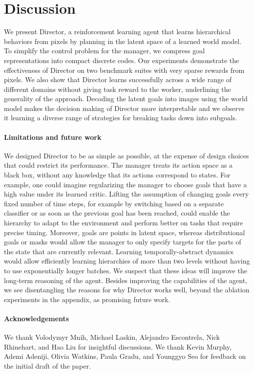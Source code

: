 \vspace*{-1ex}
\section{Discussion}
\label{sec:discussion}
\vspace*{-1.5ex}

We present Director, a reinforcement learning agent that learns hierarchical behaviors from pixels by planning in the latent space of a learned world model. 
To simplify the control problem for the manager, we compress goal representations into compact discrete codes. 
Our experiments demonstrate the effectiveness of Director on two benchmark suites with very sparse rewards from pixels. 
We also show that Director learns successfully across a wide range of different domains without giving task reward to the worker, underlining the generality of the approach. 
Decoding the latent goals into images using the world model makes the decision making of Director more interpretable and we observe it learning a diverse range of strategies for breaking tasks down into subgoals.

\paragraph{Limitations and future work}

We designed Director to be as simple as possible, at the expense of design choices that could restrict its performance.
The manager treats its action space as a black box, without any knowledge that its actions correspond to states. For example, one could imagine regularizing the manager to choose goals that have a high value under its learned critic. 
Lifting the assumption of changing goals every fixed number of time steps, for example by switching based on a separate classifier or as soon as the previous goal has been reached, could enable the hierarchy to adapt to the environment and perform better on tasks that require precise timing. 
Moreover, goals are points in latent space, whereas distributional goals or masks would allow the manager to only specify targets for the parts of the state that are currently relevant.
Learning temporally-abstract dynamics would allow efficiently learning hierarchies of more than two levels without having to use exponentially longer batches.
We suspect that these ideas will improve the long-term reasoning of the agent.
Besides improving the capabilities of the agent, we see disentangling the reasons for why Director works well, beyond the ablation experiments in the appendix, as promising future work.

\paragraph{Acknowledgements}

We thank Volodymyr Mnih, Michael Laskin, Alejandro Escontrela, Nick Rhinehart, and Hao Liu for insightful discussions. We thank Kevin Murphy, Ademi Adeniji, Olivia Watkins, Paula Gradu, and Younggyo Seo for feedback on the initial draft of the paper.
